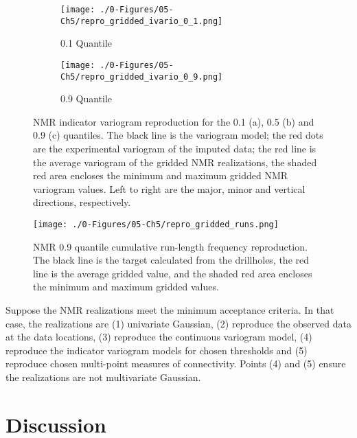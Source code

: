 \begin{figure}
    \begin{subfigure}{1.0\textwidth}
        \centering
        \texttt{[image: ./0-Figures/05-Ch5/repro\_gridded\_ivario\_0\_1.png]}
        \caption{0.1 Quantile}
    \end{subfigure}
    \begin{subfigure}{1.0\textwidth}
        \centering
        \texttt{[image: ./0-Figures/05-Ch5/repro\_gridded\_ivario\_0\_9.png]}
        \caption{0.9 Quantile}
    \end{subfigure}
    \caption{\gls{NMR} indicator variogram reproduction for the 0.1 (a), 0.5 (b) and 0.9 (c) quantiles. The black line is the variogram model; the red dots are the experimental variogram of the imputed data; the red line is the average variogram of the gridded \gls{NMR} realizations, the shaded red area encloses the minimum and maximum gridded \gls{NMR} variogram values. Left to right are the major, minor and vertical directions, respectively.}
    \label{fig:repro_gridded_ivario_ch5}
\end{figure}

\begin{figure}[htb!]
    \centering
    \texttt{[image: ./0-Figures/05-Ch5/repro\_gridded\_runs.png]}
    \caption{\gls{NMR} 0.9 quantile cumulative run-length frequency reproduction. The black line is the target calculated from the drillholes, the red line is the average gridded value, and the shaded red area encloses the minimum and maximum gridded values. }
    \label{fig:repro_gridded_runs_ch5}
\end{figure}

Suppose the \gls{NMR} realizations meet the minimum acceptance criteria. In that case, the realizations are (1) univariate Gaussian, (2) reproduce the observed data at the data locations, (3) reproduce the continuous variogram model, (4) reproduce the indicator variogram models for chosen thresholds and (5) reproduce chosen multi-point measures of connectivity. Points (4) and (5) ensure the realizations are not multivariate Gaussian.

\FloatBarrier
\section{Discussion}
\label{sec:05discuss}

